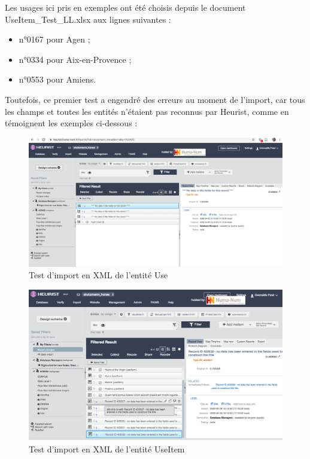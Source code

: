 \documentclass[a4paper,12pt,twoside]{book}
\begin{document}
Les usages ici pris en exemples ont été choisis depuis le document UseItem\_Test\_LL.xlsx aux lignes suivantes :
\begin{itemize}
    \item n°0167 pour Agen ;
    \item n°0334 pour Aix-en-Provence ;
    \item n°0553 pour Amiens.
\end{itemize}

Toutefois, ce premier test a engendré des erreurs au moment de l'import, car tous les champs et toutes les entités n'étaient pas reconnus par Heurist, comme en témoignent les exemples ci-dessous : 

    \begin{figure}[!h]
    \centering
    \includegraphics[width=15cm]{img/Import_Donnees/resultatTestXML1Use.png}
    \caption{Test d'import en XML de l'entité Use}
    \end{figure}
    
    \begin{figure}[!h]
    \centering
    \includegraphics[width=15cm]{img/Import_Donnees/ImportTestXMLUseItem1.png}
    \caption{Test d'import en XML de l'entité UseItem}
    \end{figure}
    \clearpage
    
\end{document}

